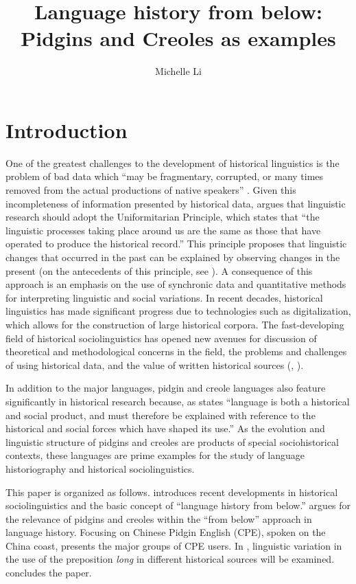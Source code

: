 \documentclass[output=paper]{langsci/langscibook}
\author{Michelle Li\affiliation{Caritas Institute of Higher Education, Hong Kong}\orcid{}}
\title{Language history from below: Pidgins and Creoles as examples}
\begin{document}
\maketitle

\section{Introduction} 
One of the greatest challenges to the development of historical linguistics is the problem of bad data which “may be fragmentary, corrupted, or many times removed from the actual productions of native speakers” \citep[100]{labov_principles_1972}. Given this incompleteness of information presented by historical data, \citet[101]{labov_principles_1972} argues that linguistic research should adopt the Uniformitarian Principle, which states that “the linguistic processes taking place around us are the same as those that have operated to produce the historical record.” This principle proposes that linguistic changes that occurred in the past can be explained by observing changes in the present (on the antecedents of this principle, see \citealt{christy_uniformitarianism_1983}). A consequence of this approach is an emphasis on the use of synchronic data and quantitative methods for interpreting linguistic and social variations. In recent decades, historical linguistics has made significant progress due to technologies such as digitalization, which allows for the construction of large historical corpora. The fast-developing field of historical sociolinguistics has opened new avenues for discussion of theoretical and methodological concerns in the field, the problems and challenges of using historical data, and the value of written historical sources (\citealt{hernandez-campoy_handbook_2012}, \citealt{russi_current_2016}). 

In addition to the major languages, pidgin and creole languages also feature significantly in historical research because, as \citet[1696]{romaine_historical_2005} states “language is both a historical and social product, and must therefore be explained with reference to the historical and social forces which have shaped its use.” As the evolution and linguistic structure of pidgins and creoles are products of special sociohistorical contexts, these languages are prime examples for the study of language historiography and historical sociolinguistics. 

This paper is organized as follows.  introduces recent developments in historical sociolinguistics and the basic concept of “language history from below.”  argues for the relevance of pidgins and creoles within the “from below” approach in language history. Focusing on Chinese Pidgin English (CPE), spoken on the China coast,  presents the major groups of CPE users. In , linguistic variation in the use of the preposition \textit{long} in different historical sources will be examined.  concludes the paper.
\end{document}
